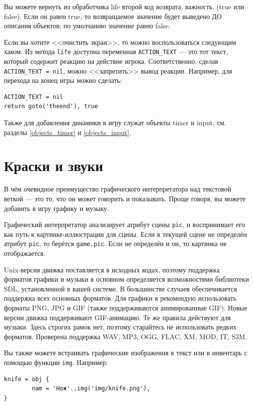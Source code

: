 \documentclass[a4paper,12pt]{article}
\begin{document}
Вы можете вернуть из обработчика life второй код возврата, важность. (true или false). Если он равен true, то возвращаемое значение будет выведено ДО описания объектов; по умолчанию значение равно false.

Если вы хотите <<очистить экран>>, то можно воспользоваться следующим хаком. Из метода \verb/life/ доступна переменная \verb/ACTION_TEXT/ --- это тот текст, который содержит реакцию на действие игрока. Соответственно, сделав \verb/ACTION_TEXT = nil/, можно <<запретить>> вывод реакции. Например, для перехода на конец игры можно сделать:

\begin{verbatim}
ACTION_TEXT = nil
return goto('theend'), true
\end{verbatim}

Также для добавления динамики в игру служат объекты timer и input, см. разделы \ref{objects_timer} и \ref{objects_input}.

\section{Краски и звуки}

В чём очевидное преимущество графического интерпретатора над текстовой веткой --- это то, что он может говорить и показывать. Проще говоря, вы можете добавить в игру графику и музыку.

Графический интерпретатор анализирует атрибут сцены \verb/pic/, и воспринимает его как путь к картинке-иллюстрации для сцены. Если в текущей сцене не определён атрибут \verb/pic/, то берётся \verb/game.pic/. Если не определён и он, то картинка не отображается.

Unix-версия движка поставляется в исходных кодах, поэтому поддержка форматов графики и музыки в основном определяется возможностями библиотеки SDL, установленной в вашей системе. В большинстве случаев обеспечивается поддержка всех основных форматов. Для графики я рекомендую использовать форматы PNG, JPG и GIF (также поддерживаются анимированные GIF). Новые версии движка поддерживают GIF-анимацию. Те же правила действуют для музыки. Здесь строгих рамок нет, поэтому старайтесь не использовать редких форматов. Проверена поддержка WAV, MP3, OGG, FLAC, XM, MOD, IT, S3M.

Вы также можете встраивать графические изображения в текст или в инвентарь с помощью функции \verb/img/. Например:

\begin{verbatim}
knife = obj {
        nam = 'Нож'..img('img/knife.png'),
}
\end{verbatim}
\end{document}
